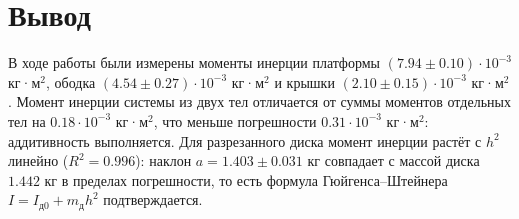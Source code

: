 \documentclass[12pt,a4paper]{article}
\begin{document}
\section*{Вывод}
В ходе работы были измерены моменты инерции платформы \((7.94 \pm 0.10) \cdot 10^{-3}\) кг·м\(^2\), ободка \((4.54 \pm 0.27) \cdot 10^{-3}\) кг·м\(^2\) и крышки \((2.10 \pm 0.15) \cdot 10^{-3}\) кг·м\(^2\). Момент инерции системы из двух тел отличается от суммы моментов отдельных тел на \(0.18 \cdot 10^{-3}\) кг·м\(^2\), что меньше погрешности \(0.31 \cdot 10^{-3}\) кг·м\(^2\): аддитивность выполняется. Для разрезанного диска момент инерции растёт с \(h^2\) линейно (\(R^2 = 0.996\)): наклон \(a = 1.403 \pm 0.031\) кг совпадает с массой диска \(1.442\) кг в пределах погрешности, то есть формула Гюйгенса--Штейнера \(I = I_{\text{д0}} + m_{\text{д}} h^2\) подтверждается.
\end{document}
